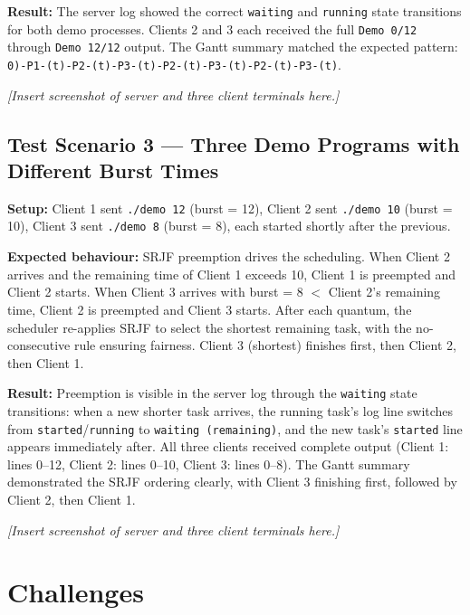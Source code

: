 \documentclass[12pt]{article}
\begin{document}
\textbf{Result:} The server log showed the correct \texttt{waiting} and \texttt{running}
state transitions for both demo processes. Clients 2 and 3 each received the full
\texttt{Demo 0/12} through \texttt{Demo 12/12} output. The Gantt summary matched the
expected pattern:
\texttt{0)-P1-(t)-P2-(t)-P3-(t)-P2-(t)-P3-(t)-P2-(t)-P3-(t)}.

\textit{[Insert screenshot of server and three client terminals here.]}

\subsection{Test Scenario 3 --- Three Demo Programs with Different Burst Times}

\textbf{Setup:} Client 1 sent \texttt{./demo 12} (burst = 12), Client 2 sent
\texttt{./demo 10} (burst = 10), Client 3 sent \texttt{./demo 8} (burst = 8), each
started shortly after the previous.

\textbf{Expected behaviour:} SRJF preemption drives the scheduling. When Client 2
arrives and the remaining time of Client 1 exceeds 10, Client 1 is preempted and Client
2 starts. When Client 3 arrives with burst = 8 $<$ Client 2's remaining time, Client 2
is preempted and Client 3 starts. After each quantum, the scheduler re-applies SRJF to
select the shortest remaining task, with the no-consecutive rule ensuring fairness.
Client 3 (shortest) finishes first, then Client 2, then Client 1.

\textbf{Result:} Preemption is visible in the server log through the \texttt{waiting}
state transitions: when a new shorter task arrives, the running task's log line switches
from \texttt{started}/\texttt{running} to \texttt{waiting (remaining)}, and the new
task's \texttt{started} line appears immediately after. All three clients received
complete output (Client 1: lines 0--12, Client 2: lines 0--10, Client 3: lines 0--8).
The Gantt summary demonstrated the SRJF ordering clearly, with Client 3 finishing first,
followed by Client 2, then Client 1.

\textit{[Insert screenshot of server and three client terminals here.]}

\section{Challenges}
\end{document}
